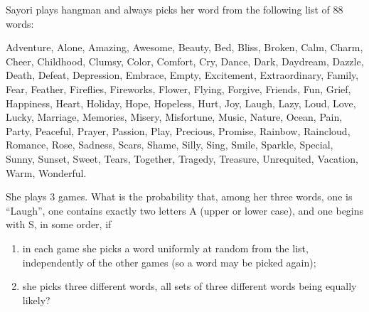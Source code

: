 Sayori plays hangman and always picks her word from the following list of $88$ words:

Adventure, Alone, Amazing, Awesome, Beauty, Bed, Bliss, Broken, Calm, Charm, Cheer, Childhood, Clumsy, Color, Comfort, Cry, Dance, Dark, Daydream, Dazzle, Death, Defeat, Depression, Embrace, Empty, Excitement, Extraordinary, Family, Fear, Feather, Fireflies, Fireworks, Flower, Flying, Forgive, Friends, Fun, Grief, Happiness, Heart, Holiday, Hope, Hopeless, Hurt, Joy, Laugh, Lazy, Loud, Love, Lucky, Marriage, Memories, Misery, Misfortune, Music, Nature, Ocean, Pain, Party, Peaceful, Prayer, Passion, Play, Precious, Promise, Rainbow, Raincloud, Romance, Rose, Sadness, Scars, Shame, Silly, Sing, Smile, Sparkle, Special, Sunny, Sunset, Sweet, Tears, Together, Tragedy, Treasure, Unrequited, Vacation, Warm, Wonderful.

She plays $3$ games. What is the probability that, among her three words, one is ``Laugh'', one contains exactly two letters A (upper or lower case), and one begins with S, in some order, if
\begin{enumerate}
\item[(a)] in each game she picks a word uniformly at random from the list, independently of the other games (so a word may be picked again);
\item[(b)] she picks three different words, all sets of three different words being equally likely?
\end{enumerate}
